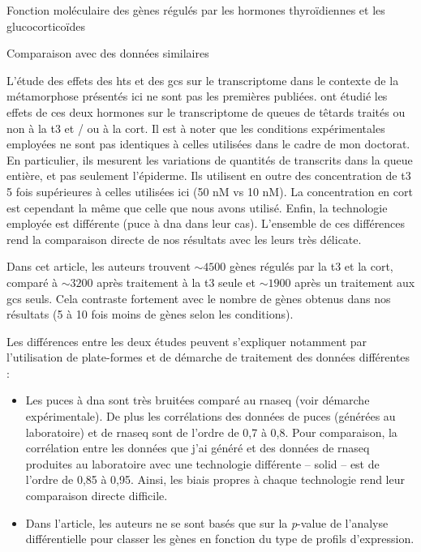 \documentclass[../main.tex]{subfiles}
\begin{document}
\begin{chapter}{Fonction moléculaire des gènes régulés par les hormones thyroïdiennes et les glucocorticoïdes}


\begin{section}{Comparaison avec des données similaires}

L'étude des effets des \glspl{ht} et des \glspl{gc} sur le transcriptome dans le contexte de la métamorphose présentés ici ne sont pas les premières publiées.
\citet{Kulkarni2012} ont étudié les effets de ces deux hormones sur le transcriptome de queues de têtards traités ou non à la \gls{t3} et / ou à la \gls{cort}.
Il est à noter que les conditions expérimentales employées ne sont pas identiques à celles utilisées dans le cadre de mon doctorat.
En particulier, ils mesurent les variations de quantités de transcrits dans la queue entière, et pas seulement l'épiderme.
Ils utilisent en outre des concentration de \gls{t3} 5 fois supérieures à celles utilisées ici (50 nM vs 10 nM).
La concentration en \gls{cort} est cependant la même que celle que nous avons utilisé.
Enfin, la technologie employée est différente (puce à \gls{dna} dans leur cas).
L'ensemble de ces différences rend la comparaison directe de nos résultats avec les leurs très délicate.
\par
Dans cet article, les auteurs trouvent $\sim 4500$ gènes régulés par la \gls{t3} et la \gls{cort}, comparé à $\sim 3200$ après traitement à la \gls{t3} seule et $\sim 1900$ après un traitement aux \glspl{gc} seuls.
Cela contraste fortement avec le nombre de gènes obtenus dans nos résultats (5 à 10 fois moins de gènes selon les conditions).
\par
Les différences entre les deux études peuvent s'expliquer notamment par l'utilisation de plate-formes et de démarche de traitement des données différentes :
\begin{itemize}
\item Les puces à \gls{dna} sont très bruitées comparé au \gls{rnaseq} (voir démarche expérimentale).
De plus les corrélations des données de puces (générées au laboratoire) et de \gls{rnaseq} sont de l'ordre de 0,7 à 0,8.
Pour comparaison, la corrélation entre les données que j'ai généré et des données de \gls{rnaseq} produites au laboratoire avec une technologie différente – \gls{solid} – est de l'ordre de 0,85 à 0,95.
Ainsi, les biais propres à chaque technologie rend leur comparaison directe difficile.
\item Dans l'article, les auteurs ne se sont basés que sur la \textit{p}-value de l'analyse différentielle pour classer les gènes en fonction du type de profils d'expression.

\end{itemize}
\end{section}
\end{chapter}
\end{document}
